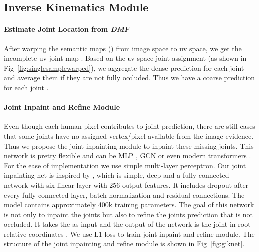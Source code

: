 \documentclass[10pt,twocolumn,letterpaper]{article}
\begin{document}
 















\subsection{Inverse Kinematics Module}
\paragraph{Estimate Joint Location from \textit{DMP}} After warping the semantic maps () from image space to uv space, we get the incomplete uv joint map . Based on the uv space joint assignment  (as shown in Fig~\ref{fig:singlesamplewarped}), we aggregate the dense prediction  for each joint and average them if they are not fully occluded. Thus we have a coarse prediction for each joint .


\paragraph{Joint Inpaint and Refine Module} Even though each human pixel contributes to joint prediction, there are still cases that some joints have no assigned vertex/pixel available from the image evidence. Thus we propose 
the joint inpainting module to inpaint these missing joints. This network is pretty flexible and can be MLP \cite{simple}, GCN \cite{semanticsgcn} or even modern transformers \cite{METRO}. For the ease of implementation we use simple multi-layer perceptron. Our joint inpainting net is inspired by \cite{simple}, which is simple, deep and a fully-connected network with six linear layer with 256 output features. It includes dropout after every fully connected layer, batch-normalization and residual connections. The model contains approximately 400k training parameters. The goal of this network is not only to inpaint the joints but also to refine the joints prediction that is not occluded. It takes  the  as input and the output of the network is the joint in root-relative coordinates . We use L1 loss  to train joint inpaint and refine module. The structure of the joint inpainting and refine module is shown in Fig~\ref{fig:giknet}. 
\end{document}
